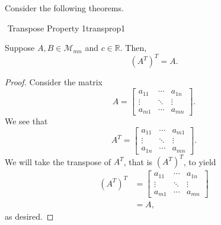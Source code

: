         \vphantom
        \\
        \\
        Consider the following theorems.
        \begin{theorem}{\Stop\,\,Transpose Property 1}{transprop1}
        
            Suppose \(A,B\in\mathcal{M}_{mn}\) and \(c\in\mathbb{R}\). Then,
            \begin{equation*}
                (A^T)^T=A.
            \end{equation*}
            \begin{proof}
                Consider the matrix 
                \begin{equation*}
                    A=\begin{bmatrix} a_{11} & \cdots & a_{1n} \\ \vdots & \ddots & \vdots \\
                    a_{m1} & \cdots & a_{mn} \end{bmatrix}.
                \end{equation*}
                We see that
                \begin{equation*}
                    A^T=\begin{bmatrix} a_{11} & \cdots & a_{m1} \\ \vdots & \ddots & \vdots \\
                    a_{1n} & \cdots & a_{mn} \end{bmatrix}.
                \end{equation*}
                We will take the transpose of \(A^T\), that is \((A^T)^T\), to yield
                \begin{align*}
                    (A^T)^T&=\begin{bmatrix} a_{11} & \cdots & a_{1n} \\ \vdots & \ddots & \vdots \\
                    a_{m1} & \cdots & a_{mn} \end{bmatrix} \\
                    &=A,
                \end{align*}
                as desired.
            \end{proof}
        \end{theorem}
        \pagebreak
